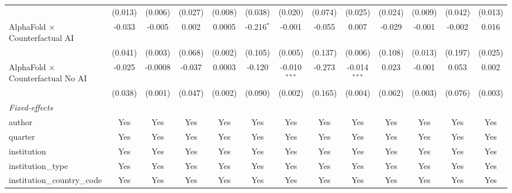 \begin{tabular}{lcccccccccccc}
                                            & (0.013)       & (0.006)       & (0.027)     & (0.008) & (0.038)      & (0.020)        & (0.074) & (0.025)        & (0.024)     & (0.009)      & (0.042)     & (0.013)\\   
   AlphaFold $\times$ Counterfactual AI     & -0.033        & -0.005        & 0.002       & 0.0005  & -0.216$^{*}$ & -0.001         & -0.055  & 0.007          & -0.029      & -0.001       & -0.002      & 0.016\\   
                                            & (0.041)       & (0.003)       & (0.068)     & (0.002) & (0.105)      & (0.005)        & (0.137) & (0.006)        & (0.108)     & (0.013)      & (0.197)     & (0.025)\\   
   AlphaFold $\times$ Counterfactual No AI  & -0.025        & -0.0008       & -0.037      & 0.0003  & -0.120       & -0.010$^{***}$ & -0.273  & -0.014$^{***}$ & 0.023       & -0.001       & 0.053       & 0.002\\   
                                            & (0.038)       & (0.001)       & (0.047)     & (0.002) & (0.090)      & (0.002)        & (0.165) & (0.004)        & (0.062)     & (0.003)      & (0.076)     & (0.003)\\   
   \midrule
   \emph{Fixed-effects}\\
   author                                   & Yes           & Yes           & Yes         & Yes     & Yes          & Yes            & Yes     & Yes            & Yes         & Yes          & Yes         & Yes\\  
   quarter                                  & Yes           & Yes           & Yes         & Yes     & Yes          & Yes            & Yes     & Yes            & Yes         & Yes          & Yes         & Yes\\  
   institution                              & Yes           & Yes           & Yes         & Yes     & Yes          & Yes            & Yes     & Yes            & Yes         & Yes          & Yes         & Yes\\  
   institution\_type                        & Yes           & Yes           & Yes         & Yes     & Yes          & Yes            & Yes     & Yes            & Yes         & Yes          & Yes         & Yes\\  
   institution\_country\_code               & Yes           & Yes           & Yes         & Yes     & Yes          & Yes            & Yes     & Yes            & Yes         & Yes          & Yes         & Yes\\  

\end{tabular}

